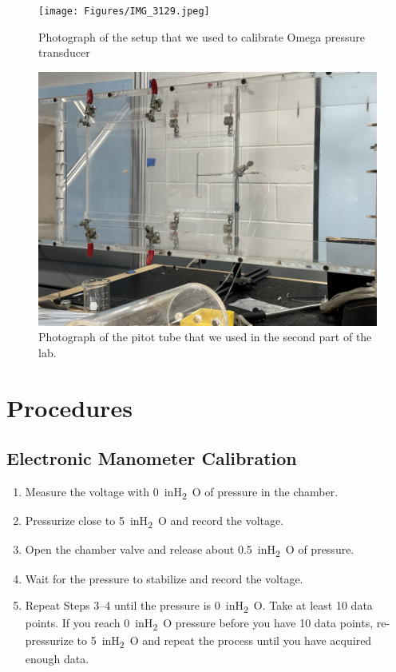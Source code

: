 \begin{figure}[htpb]
    \centering
    \texttt{[image: Figures/IMG\_3129.jpeg]}
    \caption[Photograph of the setup that we used to calibrate Omega pressure transducer]{Photograph of the setup that we used to calibrate Omega pressure transducer}
    \label{fig: IMG_3129.jpeg}
\end{figure}

\begin{figure}[htpb]
    \centering
    \includegraphics[width=0.75\linewidth]{Figures/IMG_3132.jpeg}
    \caption[Photograph of the pitot tube that we used in the second part of the lab.]{Photograph of the pitot tube that we used in the second part of the lab.}
    \label{fig: IMG_3132.jpeg}
\end{figure}

\section{Procedures}\label{sec:procedures}

\subsection{Electronic Manometer Calibration}\label{sec:calibration}

\begin{enumerate}
    \item Measure the voltage with \qty{0}{inH_2O} of pressure in the chamber. 
    \item Pressurize close to \qty{5}{inH_2O} and record the voltage. 
    \item Open the chamber valve and release about \qty{0.5}{inH_2O} of pressure.  
    \item Wait for the pressure to stabilize and record the voltage.  
    \item Repeat Steps 3–4 until the pressure is \qty{0}{inH_2O}. Take at least \num{10} data points. If you reach \qty{0}{inH_2O} pressure before you have \num{10} data points, re-pressurize to \qty{5}{inH_2O} and repeat the process until you have acquired enough data.
\end{enumerate}

